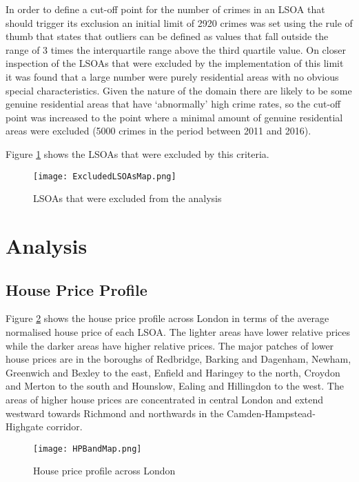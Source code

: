 \documentclass{article}
\begin{document}
In order to define a cut-off point for the number of crimes in an LSOA that should trigger its exclusion an initial limit of 2920 crimes was set using the rule of thumb that states that outliers can be defined as values that fall outside the range of 3 times the interquartile range above the third quartile value. On closer inspection of the LSOAs that were excluded by the implementation of this limit it was found that a large number were purely residential areas with no obvious special characteristics. Given the nature of the domain there are likely to be some genuine residential areas that have ‘abnormally’ high crime rates, so the cut-off point was increased to the point where a minimal amount of genuine residential areas were excluded (5000 crimes in the period between 2011 and 2016).
\newline

Figure \ref{fig:ExcludedLSOAsMap} shows the LSOAs that were excluded by this criteria.

\begin{figure}[H]
  \texttt{[image: ExcludedLSOAsMap.png]}
  \caption{LSOAs that were excluded from the analysis}
  \label{fig:ExcludedLSOAsMap}
\end{figure}
\bigskip

\section{Analysis} \label{Analysis}

\subsection{House Price Profile}

Figure \ref{fig:HPBandMap} shows the house price profile across London in terms of the average normalised house price of each LSOA. The lighter areas have lower relative prices while the darker areas have higher relative prices. The major patches of lower house prices are in the boroughs of Redbridge, Barking and Dagenham, Newham, Greenwich and Bexley to the east, Enfield and Haringey to the north, Croydon and Merton to the south and Hounslow, Ealing and Hillingdon to the west. The areas of higher house prices are concentrated in central London and extend westward towards Richmond and northwards in the Camden-Hampstead-Highgate corridor.


\begin{figure}[H]
\begin{center}
  \texttt{[image: HPBandMap.png]}
  \caption{House price profile across London}
  \label{fig:HPBandMap}
\end{center}
\end{figure}
\bigskip
\end{document}
